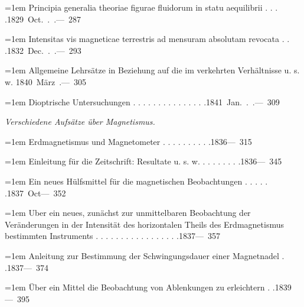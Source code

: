 \noindent\hangindent=1em Principia generalia theoriae figurae fluidorum in statu aequilibrii . . . .\unskip\hspace{1em plus 1fill}\mbox{1829 Oct. . .\quad — 287}\par\smallskip
\noindent\hangindent=1em Intensitas vis magneticae terrestris ad mensuram absolutam revocata . . .\unskip\hspace{1em plus 1fill}\mbox{1832 Dec. . .\quad — 293}\par\smallskip
\noindent\hangindent=1em Allgemeine Lehrsätze in Beziehung auf die im verkehrten Verhältnisse u. s. w. \unskip\hspace{1em plus 1fill}\mbox{1840 März .\quad — 305}\par\smallskip
\noindent\hangindent=1em Dioptrische Untersuchungen . . . . . . . . . . . . . . .\unskip\hspace{1em plus 1fill}\mbox{1841 Jan. . .\quad — 309}\par\smallskip
\par{}\medskip\noindent\textit{Verschiedene Aufsätze über Magnetismus.}\par\smallskip
\noindent\hangindent=1em Erdmagnetismus und Magnetometer . . . . . . . . . .\unskip\hspace{1em plus 1fill}\mbox{1836\quad — 315}\par\smallskip
\noindent\hangindent=1em Einleitung für die Zeitschrift: Resultate u. s. w. . . . . . . . .\unskip\hspace{1em plus 1fill}\mbox{1836\quad — 345}\par\smallskip
\noindent\hangindent=1em Ein neues Hülfsmittel für die magnetischen Beobachtungen . . . . . .\unskip\hspace{1em plus 1fill}\mbox{1837 Oct\quad — 352}\par\smallskip
\noindent\hangindent=1em Uber ein neues, zunächst zur unmittelbaren Beobachtung der Veränderungen in der Intensität des horizontalen Theils des Erdmagnetismus bestimmten Instruments . . . . . . . . . . . . . . . . .\unskip\hspace{1em plus 1fill}\mbox{1837\quad — 357}\par\smallskip
\noindent\hangindent=1em Anleitung zur Bestimmung der Schwingungsdauer einer Magnetnadel . .\unskip\hspace{1em plus 1fill}\mbox{1837\quad — 374}\par\smallskip
\noindent\hangindent=1em Über ein Mittel die Beobachtung von Ablenkungen zu erleichtern . .\unskip\hspace{1em plus 1fill}\mbox{1839\quad — 395}\par\smallskip

